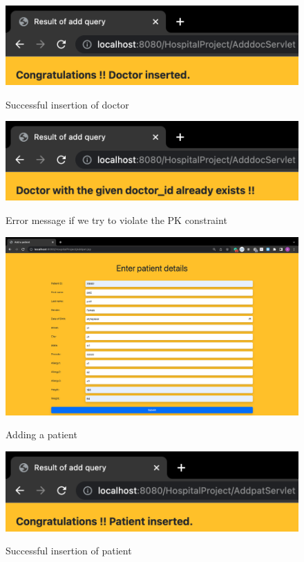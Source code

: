 \documentclass[12pt]{article}
\begin{document}
\begin{figure}[!hbt]
    \centering
    \includegraphics[scale=0.85]{screenshots/2g.png}
    \label{fig:data}
    \caption{Successful insertion of doctor}
\end{figure}

\begin{figure}[!hbt]
    \centering
    \includegraphics[scale=0.85]{screenshots/2h.png}
    \label{fig:my_label1}
    \caption{Error message if we try to violate the PK constraint}
\end{figure}

\newpage

\begin{figure}[!hbt]
    \centering
    \includegraphics[scale=0.33]{screenshots/2i.png}
    \label{fig:data}
    \caption{Adding a patient}
\end{figure}

\begin{figure}[!hbt]
    \centering
    \includegraphics[scale=0.65]{screenshots/2j.png}
    \label{fig:my_label1}
    \caption{Successful insertion of patient}
\end{figure}
\end{document}

